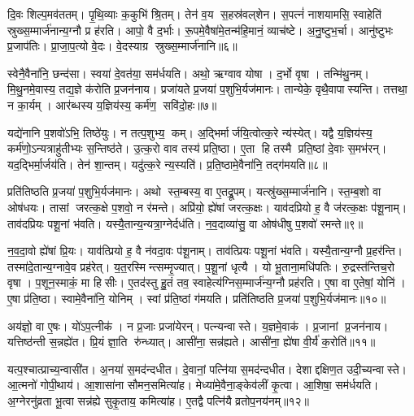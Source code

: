 दि॒वः शिल्प॒मव॑ततम्।
पृ॒थि॒व्याः क॒कुभि॑ श्रि॒तम्।
तेन॑ व॒य स॒हस्र॑वल्‌शेन।
स॒पत्नं॑ नाशयामसि॒ स्वाहेति॑ स्रुख्स॒म्मार्ज॑नान्य॒ग्नौ प्र ह॑रति।
आपो॒ वै द॒र्भाः।
रू॒पमे॒वैषा॑मे॒तन्म॑हि॒मानं॒ व्याच॑ष्टे।
अ॒नु॒ष्टुभ॒र्चा।
आनु॑ष्टुभः प्र॒जाप॑तिः।
प्रा॒जा॒प॒त्यो वे॒दः।
वे॒दस्याग्र स्रुख्स॒म्मार्ज॑नानि॥६॥

स्वेनै॒वैना॑नि॒ छन्द॑सा।
स्वया॑ दे॒वत॑या॒ सम॑र्धयति।
अथो॒ ऋग्वाव योषा।
द॒र्भो वृषा।
तन्मि॑थु॒नम्।
मि॒थु॒नमे॒वास्य॒ तद्य॒ज्ञे क॑रोति प्र॒जन॑नाय।
प्रजा॑यते प्र॒जया॑ प॒शुभि॒र्यज॑मानः।
तान्येके॒ वृथै॒वापास्यन्ति।
तत्तथा॒ न का॒र्यम्।
आर॑ब्धस्य य॒ज्ञिय॑स्य॒ कर्म॑ण॒ सवि॑दो॒हः॥७॥

यद्ये॑नानि प॒शवो॑ऽभि॒ तिष्ठे॑युः।
न तत्प॒शुभ्य॒ कम्।
अ॒द्भिर्मार्जयि॒त्वोत्क॒रे न्य॑स्येत्।
यद्वै य॒ज्ञिय॑स्य॒ कर्म॑णो॒ऽन्यत्राहु॑तीभ्यः स॒न्तिष्ठ॑ते।
उ॒त्क॒रो वाव तस्य॑ प्रति॒ष्ठा।
ए॒ता हि तस्मै प्रति॒ष्ठां दे॒वाः स॒मभ॑रन्।
यद॒द्भिर्मा॒र्जय॑ति।
तेन॑ शा॒न्तम्।
यदु॑त्क॒रे न्य॒स्यति॑।
प्र॒ति॒ष्ठामे॒वैना॑नि॒ तद्ग॑मयति॥८॥

प्रति॑तिष्ठति प्र॒जया॑ प॒शुभि॒र्यज॑मानः।
अथो स्त॒म्बस्य॒ वा ए॒तद्रू॒पम्।
यत्स्रु॑ख्स॒म्मार्ज॑नानि।
स्त॒म्ब॒शो वा ओष॑धयः।
तासां जरत्क॒क्षे प॒शवो॒ न र॑मन्ते।
अप्रि॑यो॒ ह्ये॑षां जरत्क॒क्षः।
याव॑दप्रियो ह॒ वै ज॑रत्क॒क्षः प॑शू॒नाम्।
ताव॑दप्रियः पशू॒नां भ॑वति।
यस्यै॒तान्य॒न्यत्रा॒ग्नेर्दध॑ति।
न॒व॒दाव्या॑सु॒ वा ओष॑धीषु प॒शवो॑ रमन्ते॥९॥

न॒व॒दा॒वो ह्ये॑षां प्रि॒यः।
याव॑त्प्रियो ह॒ वै न॑वदा॒वः प॑शू॒नाम्।
ताव॑त्प्रियः पशू॒नां भ॑वति।
यस्यै॒तान्य॒ग्नौ प्र॒हर॑न्ति।
तस्मा॑दे॒तान्य॒ग्नावे॒व प्रह॑रेत्।
य॒त॒रस्मिन्त्सम्मृ॒ज्यात्।
प॒शू॒नां धृत्यै।
यो भू॒ताना॒मधि॑पतिः।
रु॒द्रस्त॑न्तिच॒रो वृषा।
प॒शून॒स्माकं॒ मा हिसीः।
ए॒तद॑स्तु हु॒तं तव॒ स्वाहेत्य॑ग्निस॒म्मार्ज॑न्य॒ग्नौ प्रह॑रति।
ए॒षा वा ए॒तेषां॒ योनि॑।
ए॒षा प्र॑ति॒ष्ठा।
स्वामे॒वैना॑नि॒ योनिम्।
स्वां प्र॑ति॒ष्ठां ग॑मयति।
प्रति॑तिष्ठति प्र॒जया॑ प॒शुभि॒र्यज॑मानः॥१०॥

अय॑ज्ञो॒ वा ए॒षः।
यो॑ऽप॒त्नीक॑।
न प्र॒जाः प्रजा॑येरन्।
पत्न्यन्वास्ते।
य॒ज्ञमे॒वाक॑।
प्र॒जानां प्र॒जन॑नाय।
यत्तिष्ठ॑न्ती स॒न्नह्ये॑त।
प्रि॒यं ज्ञा॒ति रु॑न्ध्यात्।
आसी॑ना॒ सन्न॑ह्यते।
आसी॑ना॒ ह्ये॑षा वी॒र्य॑॑ क॒रोति॑॥११॥

यत्प॒श्चात्प्राच्य॒न्वासी॑त।
अ॒नया॑ स॒मद॑न्दधीत।
दे॒वानां॒ पत्नि॑या स॒मद॑न्दधीत।
देशाद्दक्षिण॒त उदी॒च्यन्वास्ते।
आ॒त्मनो॑ गोपी॒थाय॑।
आ॒शासा॑ना सौमन॒समित्या॑ह।
मेध्या॑मे॒वैना॒ङ्केव॑लीं कृ॒त्वा।
आ॒शिषा॒ सम॑र्धयति।
अ॒ग्नेरनु॑व्रता भू॒त्वा सन्न॑ह्ये सुकृ॒ताय॒ कमित्या॑ह।
ए॒तद्वै पत्नि॑यै व्रतोप॒नय॑नम्॥१२॥

